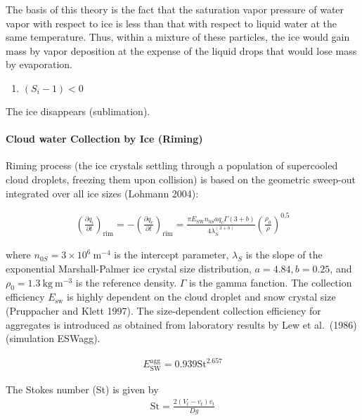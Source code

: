 The basis of this theory is the fact that the saturation vapor pressure of water vapor with respect to ice is less than that with respect to liquid water at the same temperature. Thus, within a
mixture of these particles, the ice would gain mass by vapor deposition at the expense of the liquid drops that would lose mass by evaporation.

\begin{enumerate}
\def\labelenumi{\arabic{enumi}.}
\setcounter{enumi}{1}
\tightlist
\item
  \((S_i - 1)<0\)
\end{enumerate}

The ice disappears (sublimation).

\hypertarget{cloud-water-collection-by-ice-riming}{%
\paragraph{Cloud water Collection by Ice (Riming)}\label{cloud-water-collection-by-ice-riming}}

Riming process (the ice crystals settling through a population of supercooled cloud droplets, freezing them upon collision) is based on the geometric sweep-out integrated over all ice sizes (Lohmann
2004):

\begin{eqnarray}
\left(\frac{\partial q_i}{\partial t}\right)_{\text {rim}}
=-\left(\frac{\partial q_c}{\partial t}\right)_{\text {rim}}
=\frac{\pi E_{\mathrm{SW}} n_{0S} a q_{c} \Gamma(3+b)}{4 \lambda_{S}^{(3+b)}}\left(\frac{\rho_{0}}{\rho}\right)^{0.5}
\end{eqnarray}

where \(n_{0 S}=3 \times 10^{6} \mathrm{~m}^{-4}\) is the intercept parameter, \(\lambda_{S}\) is the slope of the exponential Marshall-Palmer ice crystal size distribution, \(a=4.84, b=0.25\), and
\(\rho_{0}=1.3 \mathrm{~kg} \mathrm{~m}^{-3}\) is the reference density. \(\Gamma\) is the gamma fanction. The collection efficiency \(E_{\mathrm{sw}}\) is highly dependent on the cloud droplet and
snow crystal size (Pruppacher and Klett 1997). The size-dependent collection efficiency for aggregates is introduced as obtained from laboratory results by Lew et al.~(1986) (simulation ESWagg).

\begin{eqnarray}
E_{\mathrm{SW}}^{\mathrm{agg}}=0.939 \mathrm{St}^{2.657}
\end{eqnarray}

The Stokes number (St) is given by \begin{eqnarray}
\mathrm{St}=\frac{2\left(V_{t}-{v}_{t}\right) {v}_{t}}{D g}
\end{eqnarray}


